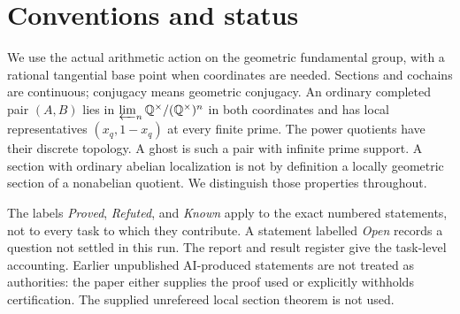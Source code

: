 \documentclass[11pt,a4paper]{article}
\begin{document}
\begin{abstract}
central coordinate, with its full real-frame ambiguity retained;
each even-weight step has one finite torsion choice.
We construct one ordinary infinite-support pair with an integral
all-prime class-two section matching every off-diagonal support
point. It has a global class-three lift, but no higher matching
or full-tower survival is inferred.
For the unchanged original factorial family, a two-first-prime
construction produces a coefficient-five class-two section matching
every support point and a global class-three lift. Its next matching
gate is compatibility of explicit two-coordinate residues; each
individual local constraint can be made solvable.
We also identify the odd-prime Heisenberg-cover genera, repair the exponent-two
exception, and prove the relevant comparison for passage to covers.
The full-section consequence of a positive answer is stronger than the
prompt states: Stix's theorem already resolves the locally ordinary case
with rational abelian pair. Every unresolved assertion is retained as such;
the audit register distinguishes complete proofs from unfinished checks.
No priority is claimed, and no result is attributed to a human contributor.
\end{abstract}
\begingroup\small\tableofcontents\endgroup
\newpage
\section*{Conventions and status}
We use the actual arithmetic action on the geometric fundamental group,
with a rational tangential base point when coordinates are needed.
Sections and cochains are continuous; conjugacy means geometric conjugacy.
An ordinary completed pair \((A,B)\) lies in
\(\varprojlim_n\mathbb Q^\times/(\mathbb Q^\times)^n\) in both coordinates
and has local representatives \((x_q,1-x_q)\) at every finite prime.
The power quotients have their discrete topology. A ghost is such a pair
with infinite prime support. A section with ordinary abelian localization
is not by definition a locally geometric section of a nonabelian quotient.
We distinguish those properties throughout.

The labels \emph{Proved}, \emph{Refuted}, and \emph{Known} apply to the exact
numbered statements, not to every task to which they contribute. A statement
labelled \emph{Open} records a question not settled in this run. The report
and result register give the task-level accounting. Earlier unpublished
AI-produced statements are not treated as authorities: the paper either
supplies the proof used or explicitly withholds certification. The supplied
unrefereed local section theorem is not used.
\end{document}

